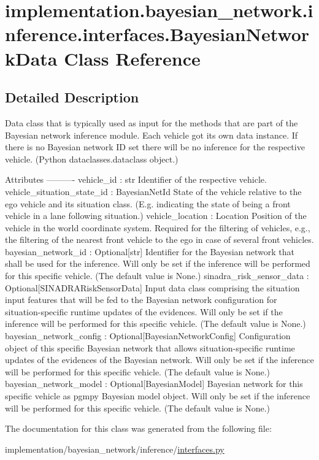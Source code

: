 \hypertarget{classimplementation_1_1bayesian__network_1_1inference_1_1interfaces_1_1_bayesian_network_data}{}\section{implementation.\+bayesian\+\_\+network.\+inference.\+interfaces.\+Bayesian\+Network\+Data Class Reference}
\label{classimplementation_1_1bayesian__network_1_1inference_1_1interfaces_1_1_bayesian_network_data}


\subsection{Detailed Description}
\begin{DoxyVerb}Data class that is typically used as input for the methods that are part of the Bayesian network inference
module. Each vehicle got its own data instance. If there is no Bayesian network ID set there will be no inference
for the respective vehicle.
(Python dataclasses.dataclass object.)

Attributes
----------
vehicle_id : str
    Identifier of the respective vehicle.
vehicle_situation_state_id : BayesianNetId
    State of the vehicle relative to the ego vehicle and its situation class.
    (E.g. indicating the state of being a front vehicle in a lane following situation.)
vehicle_location : Location
    Position of the vehicle in the world coordinate system. Required for the filtering of vehicles, e.g., the
    filtering of the nearest front vehicle to the ego in case of several front vehicles.
bayesian_network_id : Optional[str]
    Identifier for the Bayesian network that shall be used for the inference. Will only be set if the inference
    will be performed for this specific vehicle. (The default value is None.)
sinadra_risk_sensor_data : Optional[SINADRARiskSensorData]
    Input data class comprising the situation input features that will be fed to the Bayesian network configuration
    for situation-specific runtime updates of the evidences. Will only be set if the inference will be performed
    for this specific vehicle. (The default value is None.)
bayesian_network_config : Optional[BayesianNetworkConfig]
    Configuration object of this specific Bayesian network that allows situation-specific runtime updates of the
    evidences of the Bayesian network. Will only be set if the inference will be performed for this specific
    vehicle. (The default value is None.)
bayesian_network_model : Optional[BayesianModel]
    Bayesian network for this specific vehicle as pgmpy Bayesian model object. Will only be set if the inference
    will be performed for this specific vehicle. (The default value is None.)
\end{DoxyVerb}
 

The documentation for this class was generated from the following file\+:\begin{DoxyCompactItemize}
\item 
implementation/bayesian\+\_\+network/inference/\hyperlink{interfaces_8py}{interfaces.\+py}\end{DoxyCompactItemize}
